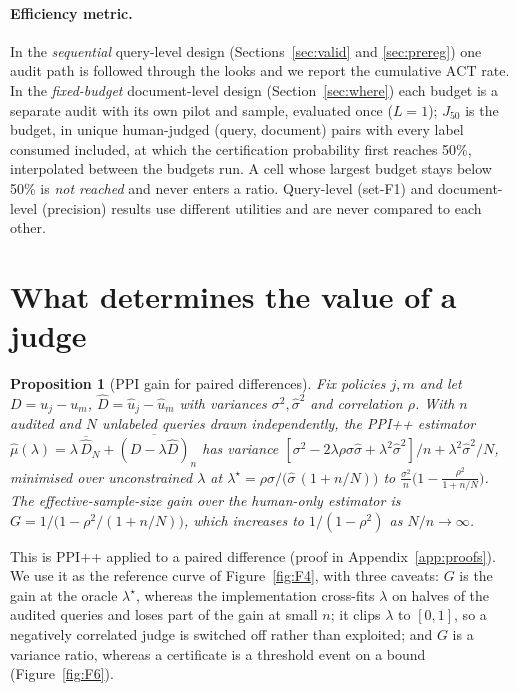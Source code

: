 \documentclass{article}
\newtheorem{proposition}{Proposition}
\newcommand{\ACT}{\mathrm{ACT}}
\newcommand{\Jfifty}{J_{50}}
\begin{document}
\paragraph{Efficiency metric.} In the \emph{sequential} query-level design (Sections~\ref{sec:valid} and \ref{sec:prereg}) one audit path is followed through the looks and we report the cumulative $\ACT$ rate. In the \emph{fixed-budget} document-level design (Section~\ref{sec:where}) each budget is a separate audit with its own pilot and sample, evaluated once ($L=1$); $\Jfifty$ is the budget, in unique human-judged (query, document) pairs with every label consumed included, at which the certification probability first reaches 50\%, interpolated between the budgets run. A cell whose largest budget stays below 50\% is \emph{not reached} and never enters a ratio. Query-level (set-F1) and document-level (precision) results use different utilities and are never compared to each other.

\section{What determines the value of a judge}\label{sec:judge}
\begin{proposition}[PPI gain for paired differences]\label{prop:A}
Fix policies $j,m$ and let $D=u_j-u_m$, $\hat D=\hat u_j-\hat u_m$ with variances $\sigma^2,\hat\sigma^2$ and correlation $\rho$. With $n$ audited and $N$ unlabeled queries drawn independently, the PPI++ estimator $\hat\mu(\lambda)=\lambda\,\overline{\hat D}_N+\overline{(D-\lambda\hat D)}_n$ has variance $[\sigma^2-2\lambda\rho\sigma\hat\sigma+\lambda^2\hat\sigma^2]/n+\lambda^2\hat\sigma^2/N$, minimised over unconstrained $\lambda$ at $\lambda^\star=\rho\sigma/\big(\hat\sigma\,(1+n/N)\big)$ to $\frac{\sigma^2}{n}\big(1-\frac{\rho^2}{1+n/N}\big)$. The effective-sample-size gain over the human-only estimator is $G=1/\big(1-\rho^2/(1+n/N)\big)$, which increases to $1/(1-\rho^2)$ as $N/n\to\infty$.
\end{proposition}
This is PPI++ \citep{angelopoulos2023ppipp} applied to a paired difference (proof in Appendix~\ref{app:proofs}). We use it as the reference curve of Figure~\ref{fig:F4}, with three caveats: $G$ is the gain at the oracle $\lambda^\star$, whereas the implementation cross-fits $\lambda$ on halves of the audited queries and loses part of the gain at small $n$; it clips $\lambda$ to $[0,1]$, so a negatively correlated judge is switched off rather than exploited; and $G$ is a variance ratio, whereas a certificate is a threshold event on a bound (Figure~\ref{fig:F6}).
\end{document}
